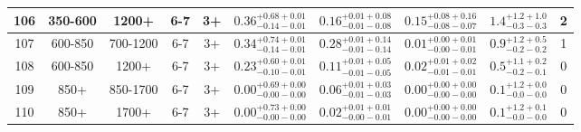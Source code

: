 \documentclass[11pt, oneside]{article}
\begin{document}
\begin{table}
{\begin{tabular}{ |c|c|c|c|c||c|c|c||c|c| }
106 & 350-600 & 1200+ & 6-7 & 3+ & $0.36^{+0.68+0.01}_{-0.14-0.01}$ & $0.16^{+0.01+0.08}_{-0.01-0.08}$ & $0.15^{+0.08+0.16}_{-0.08-0.07}$ & $1.4^{+1.2+1.0}_{-0.3-0.3}$ & 2 \\ \hline
107 & 600-850 & 700-1200 & 6-7 & 3+ & $0.34^{+0.74+0.01}_{-0.14-0.01}$ & $0.28^{+0.01+0.14}_{-0.01-0.14}$ & $0.01^{+0.00+0.01}_{-0.00-0.01}$ & $0.9^{+1.2+0.5}_{-0.2-0.2}$ & 1 \\ \hline
108 & 600-850 & 1200+ & 6-7 & 3+ & $0.23^{+0.60+0.01}_{-0.10-0.01}$ & $0.11^{+0.01+0.05}_{-0.01-0.05}$ & $0.02^{+0.01+0.02}_{-0.01-0.01}$ & $0.5^{+1.1+0.2}_{-0.2-0.1}$ & 0 \\ \hline
109 & 850+ & 850-1700 & 6-7 & 3+ & $0.00^{+0.69+0.00}_{-0.00-0.00}$ & $0.06^{+0.01+0.03}_{-0.01-0.03}$ & $0.00^{+0.00+0.00}_{-0.00-0.00}$ & $0.1^{+1.2+0.0}_{-0.0-0.0}$ & 0 \\ \hline
110 & 850+ & 1700+ & 6-7 & 3+ & $0.00^{+0.73+0.00}_{-0.00-0.00}$ & $0.02^{+0.01+0.01}_{-0.00-0.01}$ & $0.00^{+0.00+0.00}_{-0.00-0.00}$ & $0.1^{+1.2+0.1}_{-0.0-0.0}$ & 0 \\ \hline
\end{tabular}}
\end{table}
\end{document}
